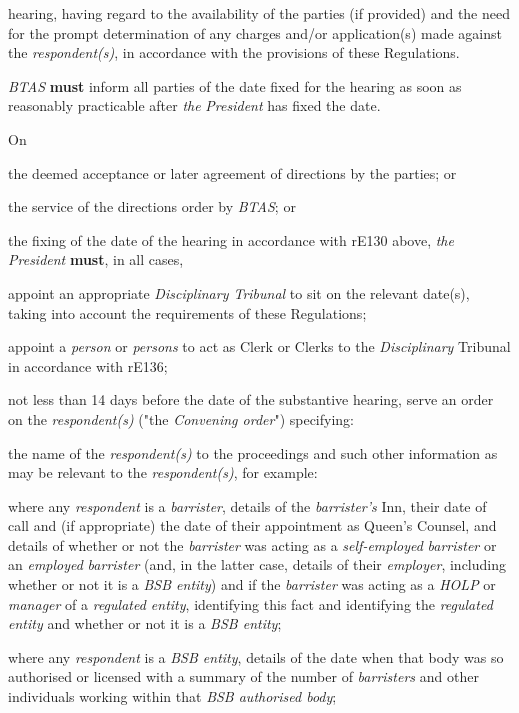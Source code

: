 hearing, having regard to the availability of the parties (if provided)
and the need for the prompt determination of any charges and/or
application(s) made against the \emph{respondent(s)}, in accordance with
the provisions of these Regulations.\\
\par
\emph{BTAS}  \textcolor{myred}{\textbf{must}} inform all parties of the date fixed for the hearing as
soon as reasonably practicable after \emph{the} \emph{President} has
fixed the date.\\
\par
{}

On\\\nl \item the deemed acceptance or later agreement of directions by the
parties; or\item the service of the directions order by \emph{BTAS}; or\item the fixing of the date of the hearing in accordance with rE130
above,\ln
\emph{the President}  \textcolor{myred}{\textbf{must}}, in all cases,\\
\al \item appoint an appropriate \emph{Disciplinary Tribunal} to sit on the
relevant date(s), taking into account the requirements of these
Regulations;\\
\item appoint a \emph{person} or \emph{persons} to act as Clerk or Clerks
to the \emph{Disciplinary }Tribunal in accordance with rE136;\\
\item not less than 14 days before the date of the substantive hearing,
serve an order on the \emph{respondent(s)} ("the \emph{Convening
order}") specifying:\\
\rl  \item the name of the \emph{respondent(s)} to the proceedings and such
other information as may be relevant to the \emph{respondent(s)}, for
example:
\nl \item where any \emph{respondent} is a \emph{barrister}, details of the \emph{barrister's} Inn, their date of call and (if appropriate) the date of their appointment as Queen's Counsel, and details of whether or not the \emph{barrister} was acting as a \emph{self-employed} \emph{barrister} or an\emph{ employed} \emph{barrister} (and, in the latter case, details of their \emph{employer}, including whether or not it is a \emph{BSB entity}) and if the \emph{barrister} was acting as a \emph{HOLP} or \emph{manager} of a \emph{regulated entity}, identifying this fact and identifying the \emph{regulated entity} and whether or not it is a \emph{BSB entity};\item where any \emph{respondent} is a \emph{BSB entity}, details of the date when that body was so authorised or licensed with a summary of the number of \emph{barristers} and other individuals working within that \emph{BSB authorised body};
